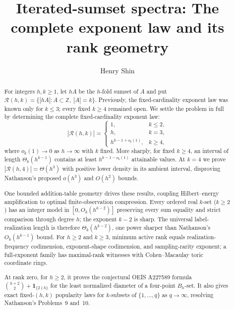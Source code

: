 \documentclass[11pt,reqno]{amsart}
\title[Iterated-sumset spectra]{Iterated-sumset spectra: The complete exponent law and its rank geometry}
\author{Henry Shin}
\date{}
\theoremstyle{definition}
\theoremstyle{remark}
\newcommand{\Rcal}{\mathcal R}
\begin{document}
\begin{abstract}
For integers $h,k\geq1$, let $hA$ be the $h$-fold sumset of $A$ and put
$\Rcal(h,k)=\{|hA|:A\subset\mathbb Z,\ |A|=k\}$.  Previously, the
fixed-cardinality exponent law was known only for $k\leq3$; every fixed
$k\geq4$ remained open.  We settle the problem in full by determining the complete fixed-cardinality exponent law:
\[
 |\Rcal(h,k)|=
 \begin{cases}
  1,&k\leq2,\\
  h,&k=3,\\
  h^{k-1+o_k(1)},&k\geq4,
 \end{cases}
\]
where $o_k(1)\to0$ as $h\to\infty$ with $k$ fixed.  More sharply, for fixed
$k\geq4$, an interval of length $\Theta_k(h^{k-1})$ contains at least
$h^{k-1-o_k(1)}$ attainable values.  At $k=4$ we prove
$|\Rcal(h,4)|=\Theta(h^3)$ with positive lower density in its ambient interval,
disproving Nathanson's proposed $o(h^3)$ and $O(h^2)$ bounds.

One bounded addition-table geometry drives these results, coupling
Hilbert--energy amplification to optimal finite-observation compression.
Every ordered real $k$-set ($k\geq2$) has an integer model in
$[0,O_k(h^{k-2})]$ preserving every sum equality and strict comparison
through degree $h$; the exponent $k-2$ is sharp.  The universal
label-realization length is therefore $\Theta_k(h^{k-2})$, one power sharper
than Nathanson's $O_k(h^{k-1})$ bound.  For $h\geq2$ and $k\geq3$, minimum
active rank equals realization-frequency codimension, exponent-shape
codimension, and sampling-rarity exponent; a full-exponent family has
maximal-rank witnesses with Cohen--Macaulay toric coordinate rings.

At rank zero, for $h\geq2$, it proves the conjectural OEIS A227589 formula
$\binom{h+2}{2}+\mathbf1_{\{2\nmid h\}}$ for the least normalized diameter
of a four-point $B_h$-set.  It also gives exact fixed-$(h,k)$ popularity
laws for $k$-subsets of $\{1,\ldots,q\}$ as $q\to\infty$, resolving
Nathanson's Problems~9 and~10.
\end{abstract}

\maketitle

\clearpage
\thispagestyle{plain}
\enlargethispage{4\baselineskip}
\begingroup
\small
\makeatletter
\renewcommand{\@pnumwidth}{2em}
\def\l@part{\@tocline{-1}{8pt plus1pt}{0pt}{}{\bfseries}}
\makeatother
\tableofcontents
\endgroup
\clearpage
\end{document}
